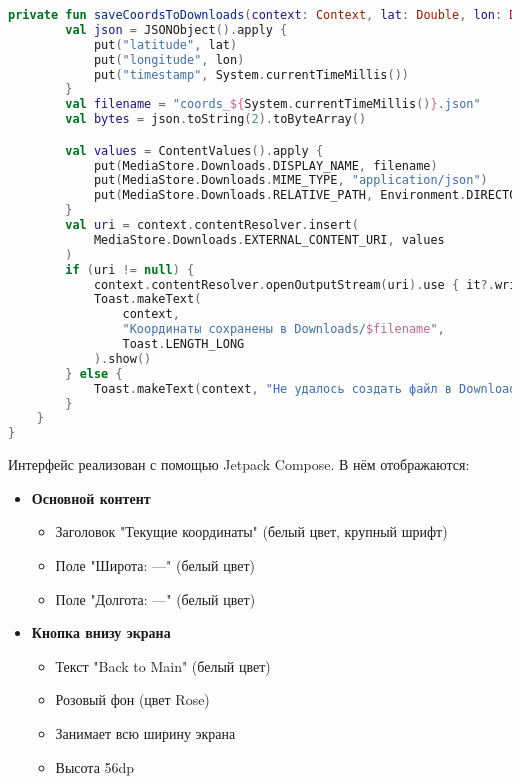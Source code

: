 \begin{lstlisting}[language=Kotlin, caption=MapPage.kt]
    private fun saveCoordsToDownloads(context: Context, lat: Double, lon: Double) {
        val json = JSONObject().apply {
            put("latitude", lat)
            put("longitude", lon)
            put("timestamp", System.currentTimeMillis())
        }
        val filename = "coords_${System.currentTimeMillis()}.json"
        val bytes = json.toString(2).toByteArray()

        val values = ContentValues().apply {
            put(MediaStore.Downloads.DISPLAY_NAME, filename)
            put(MediaStore.Downloads.MIME_TYPE, "application/json")
            put(MediaStore.Downloads.RELATIVE_PATH, Environment.DIRECTORY_DOWNLOADS)
        }
        val uri = context.contentResolver.insert(
            MediaStore.Downloads.EXTERNAL_CONTENT_URI, values
        )
        if (uri != null) {
            context.contentResolver.openOutputStream(uri).use { it?.write(bytes) }
            Toast.makeText(
                context,
                "Координаты сохранены в Downloads/$filename",
                Toast.LENGTH_LONG
            ).show()
        } else {
            Toast.makeText(context, "Не удалось создать файл в Downloads", Toast.LENGTH_SHORT).show()
        }
    }
}

\end{lstlisting}

Интерфейс реализован с помощью Jetpack Compose. В нём отображаются:

\begin{itemize}
    \item \textbf{Основной контент}
        \begin{itemize}
            \item Заголовок "Текущие координаты" (белый цвет, крупный шрифт)
            \item Поле "Широта: —" (белый цвет)
            \item Поле "Долгота: —" (белый цвет)
        \end{itemize}
    \item \textbf{Кнопка внизу экрана}
        \begin{itemize}
            \item Текст "Back to Main" (белый цвет)
            \item Розовый фон (цвет Rose)
            \item Занимает всю ширину экрана
            \item Высота 56dp
        \end{itemize}
\end{itemize}

